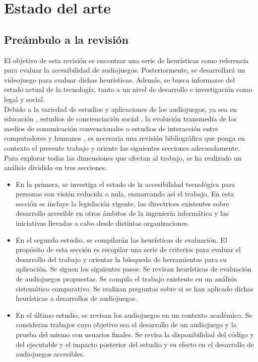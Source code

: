 \chapter{Estado del arte}
\section{Preámbulo a la revisión}
El objetivo de esta revisión es encontrar una serie de heurísticas como referencia para evaluar la accesibilidad de audiojuegos. Posteriormente, se desarrollará un videojuego para evaluar dichas heurísticas. Además, se busca informarse del estado actual de la tecnología, tanto a un nivel de desarrollo e investigación como legal y social.\\

Debido a la variedad de estudios y aplicaciones de los audiojuegos, ya sea en educación \cite{cabrera-solanoUseAudiogamesStrategic2020, araujoDesignUsabilityBraillebased2016}, estudios de concienciación social \cite{siqueiradasilvaPromotionEmpathyExperience2019}, la evolución transmedia de los medios de comunicación convencionales \cite{campoverdeAudiojuegosNuevaHerramienta2020} o estudios de interacción entre computadores y humanos \cite{cordeiroMurkyShootingUse2012}, es necesaria una revisión bibliográfica que ponga en contexto el presente trabajo y oriente las siguientes secciones adecuadamente. Para explorar todas las dimensiones que afectan al trabajo, se ha realizado un análisis dividido en tres secciones.

\begin{itemize}
\item En la primera, se investiga el estado de la accesibilidad  tecnológica para personas con visión reducida o nula, enmarcando así el trabajo. En esta sección se incluye la legislación vigente, las directrices existentes sobre desarrollo accesible en otros ámbitos de la ingeniería informática y las iniciativas llevadas a cabo desde distintas organizaciones.

\item En el segundo estudio, se compilarán las heurísticas de evaluación. El propósito de esta sección es recopilar una serie de criterios para evaluar el desarrollo del trabajo y orientar la búsqueda de herramientas para su aplicación. Se siguen los siguientes pasos:
\subitem Se revisan heurísticas de evaluación de audiojuegos propuestas.
\subitem Se compila el trabajo existente en un análisis sistemático comparativo.
\subitem Se realizan preguntas sobre si se han aplicado dichas heurísticas a desarrollos de audiojuegos.

    
\item En el último estudio, se revisan los audiojuegos en un contexto académico. Se consideran trabajos cuyo objetivo sea el desarrollo de un audiojuego y la prueba del mismo con usuarios finales. Se revisa la disponibilidad del código y del ejecutable y el impacto posterior del estudio y su efecto en el desarrollo de audiojuegos accesibles. 
    
\end{itemize} 


